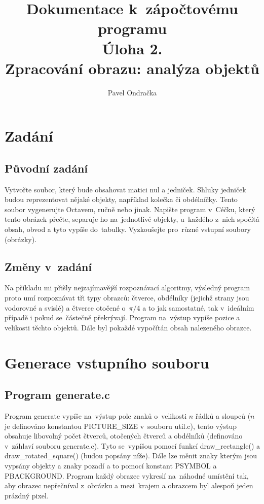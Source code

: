 \documentclass[12pt]{article}
\begin{document}
\title{Dokumentace k~zápočtovému programu \\[2cm]
	Úloha 2.\\ Zpracování obrazu: analýza objektů}
\author{Pavel Ondračka}

\maketitle
\clearpage

\tableofcontents
\clearpage



\section{Zadání}

\subsection{Původní zadání}
Vytvořte soubor, který bude obsahovat matici nul a jedniček. Shluky jedniček budou reprezentovat nějaké objekty, například kolečka či obdélníčky. Tento soubor vygenerujte Octavem, ručně nebo jinak. Napište program v~Céčku, který tento obrázek přečte, separuje ho na~jednotlivé objekty, u~každého z~nich spočítá obsah, obvod a tyto vypíše do~tabulky. Vyzkoušejte pro~různé vstupní soubory (obrázky).

\subsection{Změny v~zadání}
Na příkladu mi přišly nejzajímavější rozpoznávací algoritmy, výsledný program proto umí rozpoznávat tři typy obrazců: čtverce, obdélníky (jejichž strany jsou vodorovné a svislé) a čtverce otočené o~$\pi/4$ a to jak samostatné, tak v~ideálním případě i pokud se~částečně překrývají. Program na~výstup vypíše pozice a velikosti těchto objektů. Dále byl pokaždé vypočítán obsah nalezeného obrazce.

\section{Generace vstupního souboru}
\subsection{Program generate.c}
Program generate vypíše na~výstup pole znaků o~velikosti $n$ řádků a sloupců ($n$ je definováno konstantou PICTURE\_SIZE v~souboru util.c), tento výstup obsahuje libovolný počet čtverců, otočených čtverců a obdélníků (definováno v~záhlaví souboru generate.c). Tyto se~vypíšou pomocí funkcí draw\_rectangle() a draw\_rotated\_square() (budou popsány níže). Dále lze měnit znaky kterým jsou vypsány objekty a znaky pozadí a to pomocí konstant PSYMBOL a PBACKGROUND. Program každý obrazec vykreslí na~náhodné umístění tak, aby obrazec nepřečníval z~obrázku a mezi~krajem a obrazcem byl alespoň jeden prázdný pixel.
\end{document}
